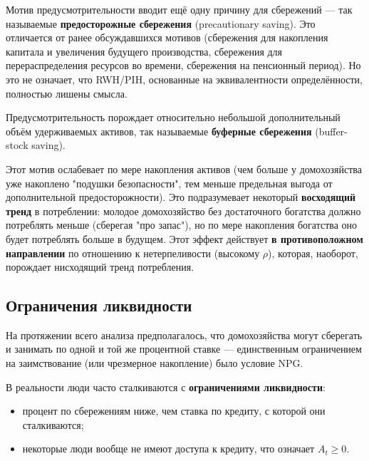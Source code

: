 \documentclass[10pt,a4paper]{article}
\begin{document}
Мотив предусмотрительности вводит ещё одну причину для сбережений — так называемые \textbf{предосторожные сбережения} (precautionary saving). Это отличается от ранее обсуждавшихся мотивов (сбережения для накопления капитала и увеличения будущего производства, сбережения для перераспределения ресурсов во времени, сбережения на пенсионный период). Но это не означает, что RWH/PIH, основанные на эквивалентности определённости, полностью лишены смысла.

Предусмотрительность порождает относительно небольшой дополнительный объём удерживаемых активов, так называемые \textbf{буферные сбережения} (buffer-stock saving).

\begin{intuition}
Этот мотив ослабевает по мере накопления активов (чем больше у домохозяйства уже накоплено "подушки безопасности", тем меньше предельная выгода от дополнительной предосторожности). Это подразумевает некоторый \textbf{восходящий тренд} в потреблении: молодое домохозяйство без достаточного богатства должно потреблять меньше (сберегая "про запас"), но по мере накопления богатства оно будет потреблять больше в будущем. Этот эффект действует \textbf{в противоположном направлении} по отношению к нетерпеливости (высокому $\rho$), которая, наоборот, порождает нисходящий тренд потребления.
\end{intuition}

\subsection{Ограничения ликвидности}

На протяжении всего анализа предполагалось, что домохозяйства могут сберегать и занимать по одной и той же процентной ставке — единственным ограничением на заимствование (или чрезмерное накопление) было условие NPG.

В реальности люди часто сталкиваются с \textbf{ограничениями ликвидности}:
\begin{itemize}[leftmargin=1.3em]
\item процент по сбережениям ниже, чем ставка по кредиту, с которой они сталкиваются;
\item некоторые люди вообще не имеют доступа к кредиту, что означает $A_t \ge 0$.
\end{itemize}
\end{document}
